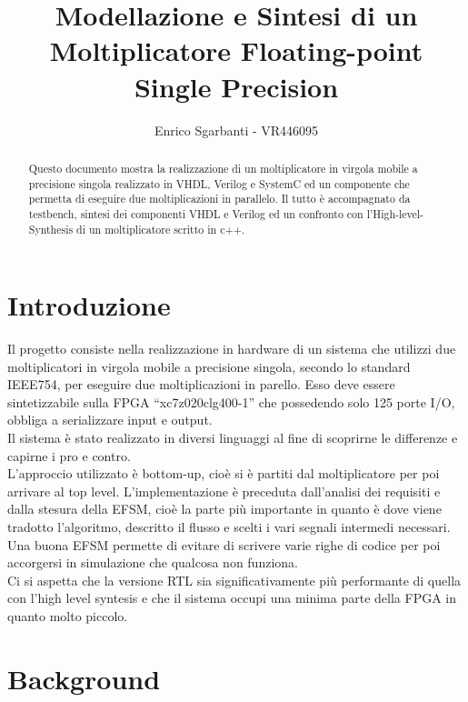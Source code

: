 \documentclass[]{IEEEtran}
\title{Modellazione e Sintesi di un Moltiplicatore Floating-point Single Precision}
\author{Enrico Sgarbanti - VR446095}
\begin{document}
\maketitle



\begin{abstract}
    Questo documento mostra la realizzazione di un moltiplicatore in virgola mobile a precisione singola realizzato in VHDL, Verilog e SystemC ed un componente che permetta di eseguire due moltiplicazioni in parallelo. Il tutto è accompagnato da testbench, sintesi dei componenti VHDL e Verilog ed un confronto con l'High-level-Synthesis di un moltiplicatore scritto in c++.
\end{abstract}



\section{Introduzione}
Il progetto consiste nella realizzazione in hardware di un sistema che utilizzi due moltiplicatori in virgola mobile a precisione singola, secondo lo standard IEEE754, per eseguire due moltiplicazioni in parello. Esso deve essere sintetizzabile sulla FPGA ``xc7z020clg400-1'' che possedendo solo 125 porte I/O, obbliga a serializzare input e output.
\\Il sistema è stato realizzato in diversi linguaggi al fine di scoprirne le differenze e capirne i pro e contro.
\\L'approccio utilizzato è bottom-up, cioè si è partiti dal moltiplicatore per poi arrivare al top level. L'implementazione è preceduta dall'analisi dei requisiti e dalla stesura della EFSM, cioè la parte più importante in quanto è dove viene tradotto l'algoritmo, descritto il flusso e scelti i vari segnali intermedi necessari. Una buona EFSM permette di evitare di scrivere varie righe di codice per poi accorgersi in simulazione che qualcosa non funziona.
\\Ci si aspetta che la versione RTL sia significativamente più performante di quella con l'high level syntesis e che il sistema occupi una minima parte della FPGA in quanto molto piccolo.



\section{Background}
\end{document}
